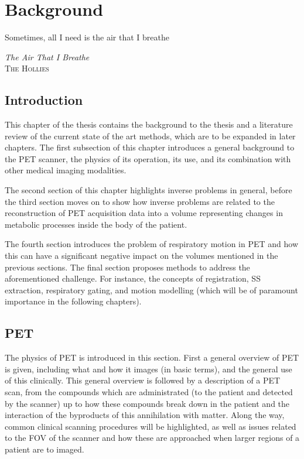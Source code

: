 \chapter{Background} \label{sec:background}
    \vspace*{\fill}
    \setlength{\epigraphwidth}{0.5\linewidth}
    \renewcommand{\epigraphflush}{flushright}
    \renewcommand{\epigraphsize}{\footnotesize}
    \epigraph{Sometimes, all I need is the air that I breathe}%
              {\textit{The Air That I Breathe}\\ \textsc{The Hollies}}
    
    \newpage
    
    \section{Introduction} \label{sec:background_introduction}
        This chapter of the thesis contains the background to the thesis and a literature review of the current state of the art methods, which are to be expanded in later chapters. The first subsection of this chapter introduces a general background to the \gls{PET} scanner, the physics of its operation, its use, and its combination with other medical imaging modalities.
        
        The second section of this chapter highlights inverse problems in general, before the third section moves on to show how inverse problems are related to the reconstruction of \gls{PET} acquisition data into a volume representing changes in metabolic processes inside the body of the patient.
        
        The fourth section introduces the problem of respiratory motion in \gls{PET} and how this can have a significant negative impact on the volumes mentioned in the previous sections. The final section proposes methods to address the aforementioned challenge. For instance, the concepts of registration, \gls{SS} extraction, respiratory gating, and motion modelling (which will be of paramount importance in the following chapters).
    
    \section{PET} \label{sec:pet}
        The physics of \gls{PET} is introduced in this section. First a general overview of \gls{PET} is given, including what and how it images (in basic terms), and the general use of this clinically. This general overview is followed by a description of a \gls{PET} scan, from the compounds which are administrated (to the patient and detected by the scanner) up to how these compounds break down in the patient and the interaction of the byproducts of this annihilation with matter. Along the way, common clinical scanning procedures will be highlighted, as well as issues related to the \gls{FOV} of the scanner and how these are approached when larger regions of a patient are to imaged.
            
